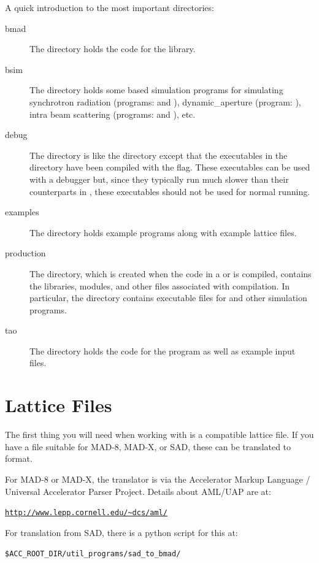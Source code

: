 \documentclass{hitec}
\newcommand{\Section}[1]{\section{#1}\vspace*{-1ex}}
\newenvironment{display}
  {\vspace*{-1.5ex} \begin{alltt}}
  {\end{alltt} \vspace*{-1.0ex}}
\begin{document}
A quick introduction to the most important directories:
  \begin{description}
  \item[bmad] \Newline
The  directory holds the code for the \bmad library.
  \item[bsim] \Newline
The  directory holds some \bmad based simulation programs for simulating
synchrotron radiation (programs:  and ), dynamic_aperture
(program: ), intra beam scattering (programs:  and
), etc.
  \item[debug] \Newline
The  directory is like the  directory except that the executables
in the  directory have been compiled with the  flag. These executables
can be used with a debugger but, since they typically run much slower than their counterparts in
, these executables should not be used for normal running.
  \item[examples] \Newline
The  directory holds example programs along with example lattice files.
  \item[production] \Newline
The  directory, which is created when the code in a  or
 is compiled, contains the libraries, modules, and other files associated with
compilation. In particular, the  directory contains executable files
for \tao and other simulation programs.

  \item[tao] \Newline
The  directory holds the code for the \tao program as well as example input
files.
  \end{description}

\Section{Lattice Files}

The first thing you will need when working with \bmad is a \bmad compatible lattice file.
If you have a file suitable for MAD-8, MAD-X, or SAD, these can be translated to \bmad
format. 

For MAD-8 or MAD-X, the translator is via the Accelerator Markup Language /
Universal Accelerator Parser Project. Details about AML/UAP are at:
\begin{display}
  \url{http://www.lepp.cornell.edu/~dcs/aml/}
\end{display}

For translation from SAD, there is a python script for this at:
\begin{display}
   \$ACC_ROOT_DIR/util_programs/sad_to_bmad/
\end{display}
\end{document}
